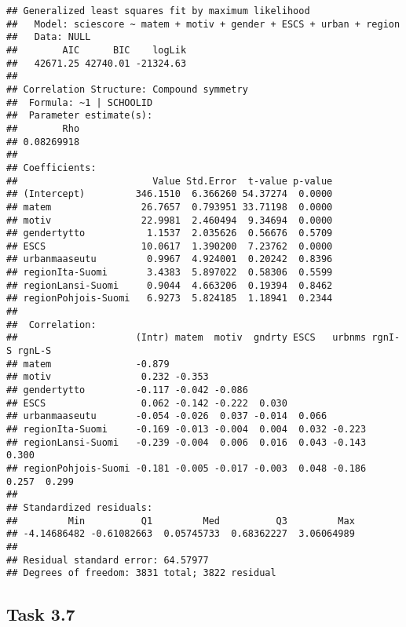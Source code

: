 \documentclass[
]{article}
\begin{document}
\begin{verbatim}
## Generalized least squares fit by maximum likelihood
##   Model: sciescore ~ matem + motiv + gender + ESCS + urban + region 
##   Data: NULL 
##        AIC      BIC    logLik
##   42671.25 42740.01 -21324.63
## 
## Correlation Structure: Compound symmetry
##  Formula: ~1 | SCHOOLID 
##  Parameter estimate(s):
##        Rho 
## 0.08269918 
## 
## Coefficients:
##                        Value Std.Error  t-value p-value
## (Intercept)         346.1510  6.366260 54.37274  0.0000
## matem                26.7657  0.793951 33.71198  0.0000
## motiv                22.9981  2.460494  9.34694  0.0000
## gendertytto           1.1537  2.035626  0.56676  0.5709
## ESCS                 10.0617  1.390200  7.23762  0.0000
## urbanmaaseutu         0.9967  4.924001  0.20242  0.8396
## regionIta-Suomi       3.4383  5.897022  0.58306  0.5599
## regionLansi-Suomi     0.9044  4.663206  0.19394  0.8462
## regionPohjois-Suomi   6.9273  5.824185  1.18941  0.2344
## 
##  Correlation: 
##                     (Intr) matem  motiv  gndrty ESCS   urbnms rgnI-S rgnL-S
## matem               -0.879                                                 
## motiv                0.232 -0.353                                          
## gendertytto         -0.117 -0.042 -0.086                                   
## ESCS                 0.062 -0.142 -0.222  0.030                            
## urbanmaaseutu       -0.054 -0.026  0.037 -0.014  0.066                     
## regionIta-Suomi     -0.169 -0.013 -0.004  0.004  0.032 -0.223              
## regionLansi-Suomi   -0.239 -0.004  0.006  0.016  0.043 -0.143  0.300       
## regionPohjois-Suomi -0.181 -0.005 -0.017 -0.003  0.048 -0.186  0.257  0.299
## 
## Standardized residuals:
##         Min          Q1         Med          Q3         Max 
## -4.14686482 -0.61082663  0.05745733  0.68362227  3.06064989 
## 
## Residual standard error: 64.57977 
## Degrees of freedom: 3831 total; 3822 residual
\end{verbatim}

\hypertarget{task-3.7}{%
\subsection{Task 3.7}\label{task-3.7}}
\end{document}
